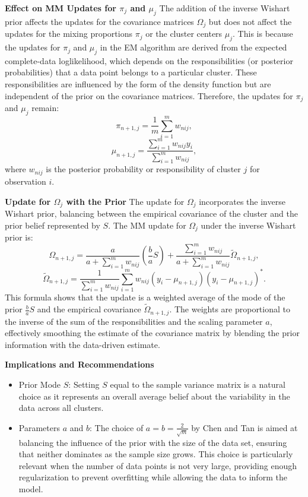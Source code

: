 \documentclass[8pt]{article}
\begin{document}
{\textbf{Effect on MM Updates for \(\pi_j\) and \(\mu_j\)}
The addition of the inverse Wishart prior affects the updates for the covariance matrices \(\Omega_j\) but does not affect the updates for the mixing proportions \(\pi_j\) or the cluster centers \(\mu_j\). This is because the updates for \(\pi_j\) and \(\mu_j\) in the EM algorithm are derived from the expected complete-data loglikelihood, which depends on the responsibilities (or posterior probabilities) that a data point belongs to a particular cluster. These responsibilities are influenced by the form of the density function but are independent of the prior on the covariance matrices. Therefore, the updates for \(\pi_j\) and \(\mu_j\) remain:
\[
\pi_{n+1,j} = \frac{1}{m} \sum_{i=1}^m w_{nij},
\]
\[
\mu_{n+1,j} = \frac{\sum_{i=1}^m w_{nij} y_i}{\sum_{i=1}^m w_{nij}},
\]
where \(w_{nij}\) is the posterior probability or responsibility of cluster \(j\) for observation \(i\).

\textbf{Update for \(\Omega_j\) with the Prior}
The update for \(\Omega_j\) incorporates the inverse Wishart prior, balancing between the empirical covariance of the cluster and the prior belief represented by \(S\). The MM update for \(\Omega_j\) under the inverse Wishart prior is:
\[
\Omega_{n+1,j} = \frac{a}{a + \sum_{i=1}^{m} w_{nij}} \left( \frac{b}{a} S \right) + \frac{\sum_{i=1}^{m} w_{nij}}{a + \sum_{i=1}^{m} w_{nij}} \tilde{\Omega}_{n+1,j},
\]
\[
\tilde{\Omega}_{n+1,j} = \frac{1}{\sum_{i=1}^{m} w_{nij}} \sum_{i=1}^{m} w_{nij} (y_i - \mu_{n+1,j})(y_i - \mu_{n+1,j})^*.
\]
This formula shows that the update is a weighted average of the mode of the prior \(\frac{b}{a} S\) and the empirical covariance \(\tilde{\Omega}_{n+1,j}\). The weights are proportional to the inverse of the sum of the responsibilities and the scaling parameter \(a\), effectively smoothing the estimate of the covariance matrix by blending the prior information with the data-driven estimate.

\textbf{Implications and Recommendations}
\begin{itemize}
    \item Prior Mode \(S\): Setting \(S\) equal to the sample variance matrix is a natural choice as it represents an overall average belief about the variability in the data across all clusters.
    \item Parameters \(a\) and \(b\): The choice of \(a = b = \frac{2}{\sqrt{m}}\) by Chen and Tan is aimed at balancing the influence of the prior with the size of the data set, ensuring that neither dominates as the sample size grows. This choice is particularly relevant when the number of data points is not very large, providing enough regularization to prevent overfitting while allowing the data to inform the model.
\end{itemize}

}
\end{document}
